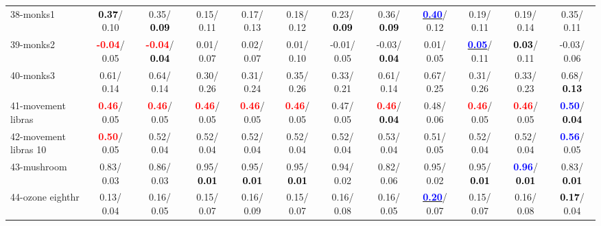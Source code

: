 \begin{table}[h]
\begin{center}
{\begin{tabular}{lc|c|c|c|c|c|c|c|c|c|c}
38-monks1 & \textcolor{black}{\textbf{  0.37}}/  0.10 &   0.35/\textcolor{black}{\textbf{  0.09}} &   0.15/  0.11 &   0.17/  0.13 &   0.18/  0.12 &   0.23/\textcolor{black}{\textbf{  0.09}} &   0.36/\textcolor{black}{\textbf{  0.09}} & \underline{\textcolor{blue}{\textbf{  0.40}}}/  0.12 &   0.19/  0.11 &   0.19/  0.14 &   0.35/  0.11 \\
39-monks2 & \textcolor{red}{\textbf{ -0.04}}/  0.05 & \textcolor{red}{\textbf{ -0.04}}/\textcolor{black}{\textbf{  0.04}} &   0.01/  0.07 &   0.02/  0.07 &   0.01/  0.10 &  -0.01/  0.05 &  -0.03/\textcolor{black}{\textbf{  0.04}} &   0.01/  0.05 & \underline{\textcolor{blue}{\textbf{  0.05}}}/  0.11 & \textcolor{black}{\textbf{  0.03}}/  0.11 &  -0.03/  0.06 \\ \hline
40-monks3 &   0.61/  0.14 &   0.64/  0.14 &   0.30/  0.26 &   0.31/  0.24 &   0.35/  0.26 &   0.33/  0.21 &   0.61/  0.14 &   0.67/  0.25 &   0.31/  0.26 &   0.33/  0.23 &   0.68/\textcolor{black}{\textbf{  0.13}} \\
41-movement libras & \textcolor{red}{\textbf{  0.46}}/  0.05 & \textcolor{red}{\textbf{  0.46}}/  0.05 & \textcolor{red}{\textbf{  0.46}}/  0.05 & \textcolor{red}{\textbf{  0.46}}/  0.05 & \textcolor{red}{\textbf{  0.46}}/  0.05 &   0.47/  0.05 & \textcolor{red}{\textbf{  0.46}}/\textcolor{black}{\textbf{  0.04}} &   0.48/  0.06 & \textcolor{red}{\textbf{  0.46}}/  0.05 & \textcolor{red}{\textbf{  0.46}}/  0.05 & \textcolor{blue}{\textbf{  0.50}}/\textcolor{black}{\textbf{  0.04}} \\
42-movement libras 10 & \textcolor{red}{\textbf{  0.50}}/  0.05 &   0.52/  0.04 &   0.52/  0.04 &   0.52/  0.04 &   0.52/  0.04 &   0.52/  0.04 &   0.53/  0.04 &   0.51/  0.05 &   0.52/  0.04 &   0.52/  0.04 & \textcolor{blue}{\textbf{  0.56}}/  0.05 \\
43-mushroom &   0.83/  0.03 &   0.86/  0.03 &   0.95/\textcolor{black}{\textbf{  0.01}} &   0.95/\textcolor{black}{\textbf{  0.01}} &   0.95/\textcolor{black}{\textbf{  0.01}} &   0.94/  0.02 &   0.82/  0.06 &   0.95/  0.02 &   0.95/\textcolor{black}{\textbf{  0.01}} & \textcolor{blue}{\textbf{  0.96}}/\textcolor{black}{\textbf{  0.01}} &   0.83/\textcolor{black}{\textbf{  0.01}} \\
44-ozone eighthr &   0.13/  0.04 &   0.16/  0.05 &   0.15/  0.07 &   0.16/  0.09 &   0.15/  0.07 &   0.16/  0.08 &   0.16/  0.05 & \underline{\textcolor{blue}{\textbf{  0.20}}}/  0.07 &   0.15/  0.07 &   0.16/  0.08 & \textcolor{black}{\textbf{  0.17}}/  0.04 \\

\end{tabular}}
\end{center}
\end{table}
